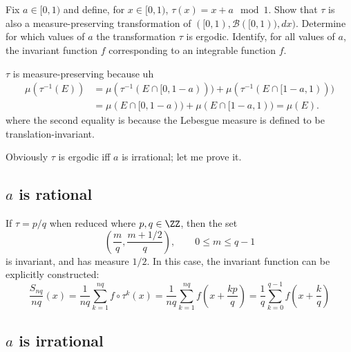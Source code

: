 \documentclass[11pt, headheight=30pt]{scrartcl}
\newcommand{\BBB}{\mathscr{B}}
\begin{document}
\section{}
\begin{prob*}
    Fix $a \in [0, 1)$ and define, for $x \in [0, 1)$, $\tau(x) = x + a \mod 1$.
    Show that $\tau$ is also a measure-preserving transformation of
    $([0, 1), \BBB([0, 1)), dx)$.
    Determine for which values of $a$ the transformation $\tau$ is ergodic.
    Identify, for all values of $a$, the invariant function $f$ corresponding
    to an integrable function $f$.
\end{prob*}


$\tau$ is measure-preserving because uh
\begin{align*}
    \mu(\tau^{-1}(E)) &= \mu(\tau^{-1}(E \cap [0, 1-a))) + \mu(\tau^{-1}(E \cap [1-a, 1))) \\
    &= \mu(E \cap [0, 1-a)) + \mu(E \cap [1-a, 1)) = \mu(E).
\end{align*}
where the second equality is because the Lebesgue measure
is defined to be translation-invariant.

Obviously $\tau$ is ergodic iff $a$ is irrational; let me prove it.

\subsection{$a$ is rational}

If $\tau = p/q$ when reduced where $p,q\in \ZZ$, then the set
\[
    \left(\frac{m}{q}, \frac{m + 1/2}{q}\right),\qquad 0\leq m \leq q-1    
\]
is invariant, and has measure $1/2$. In this case, the invariant function
can be explicitly constructed:
\[
    \frac{S_{nq}}{nq}(x) = \frac{1}{nq}\sum_{k=1}^{nq} f\circ \tau^k(x) = \frac{1}{nq}\sum_{k=1}^{nq} f\left(x + \frac{kp}{q}\right)
     = \frac{1}{q}\sum_{k=0}^{q-1} f\left(x + \frac{k}{q}\right)
\]

\subsection{$a$ is irrational}
\end{document}
